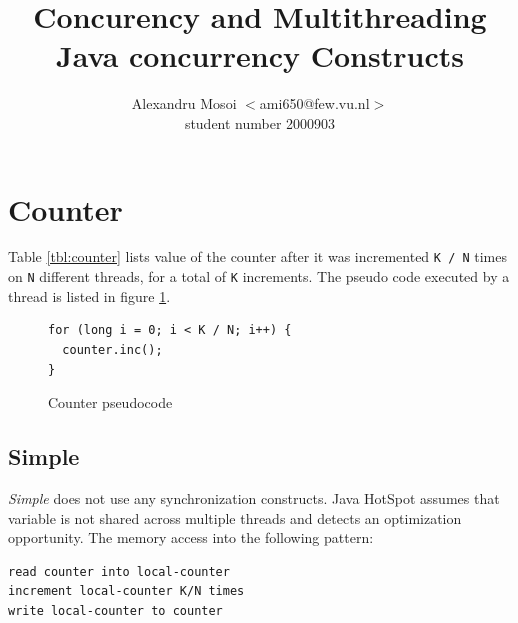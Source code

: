 \documentclass[12pt]{article}
\title{Concurency and Multithreading\\
       Java concurrency Constructs}
\author{Alexandru Mosoi $<$ami650@few.vu.nl$>$\\
        student number 2000903}
\begin{document}
\maketitle


\section{Counter}

\begin{table}[h!]
  \centering
  \small

  \caption{Counter value for variable N and K = 2.000.000.000 on a 4 logical
  cores processor}
  \label{tbl:counter}
\end{table}


Table \ref{tbl:counter} lists value of the counter after it was incremented
\texttt{K / N} times on \texttt{N} different threads, for a total of
\texttt{K} increments. The pseudo code executed by a thread is listed in
figure \ref{fig:counter-pseudocode}.

\begin{figure}[h!]
  \begin{Verbatim}[frame=single]
for (long i = 0; i < K / N; i++) {
  counter.inc();
}
  \end{Verbatim}
  \caption{Counter pseudocode}
  \label{fig:counter-pseudocode}
\end{figure}

\subsection{Simple}
\label{ssec:simple}

\emph{Simple} does not use any synchronization constructs. Java
HotSpot assumes that variable is not shared across multiple threads and
detects an optimization opportunity. The memory access into the following
pattern:

\begin{verbatim}
read counter into local-counter
increment local-counter K/N times
write local-counter to counter
\end{verbatim}
\end{document}
